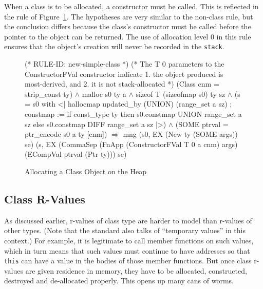 \documentclass[11pt]{article}
\begin{document}
When a class is to be allocated, a constructor must be called.  This
is reflected in the rule of Figure~\ref{fig:new-simple-class}.  The
hypotheses are very similar to the non-class rule, but the conclusion
differs because the class's constructor must be called before the
pointer to the object can be returned.  The use of allocation level 0
in this rule ensures that the object's creation will never be recorded
in the \texttt{stack}.
\begin{figure}[htbp]
\begin{stdrule}
(* RULE-ID: new-simple-class *)
(* The T 0 parameters to the ConstructorFVal constructor indicate
    1. the object produced is most-derived, and
    2. it is not stack-allocated
*)
     (Class cnm = strip_const ty) \(\land\)
     malloc s0 ty a \(\land\)
     sizeof T (sizeofmap s0) ty sz \(\land\)
     (s = s0 with <|
             hallocmap updated_by (UNION) (range_set a sz) ;
             constmap := if const_type ty then
                           s0.constmap UNION range_set a sz
                         else s0.constmap DIFF range_set a sz
          |>) \(\land\)
     (SOME ptrval = ptr_encode s0 a ty [cnm])
   \(\Rightarrow\)
     mng (s0, EX (New ty (SOME args)) se)
         (s, EX (CommaSep (FnApp (ConstructorFVal T 0 a cnm) args)
                          (ECompVal ptrval (Ptr ty)))
                se)
\end{stdrule}
\caption{Allocating a Class Object on the Heap}
\label{fig:new-simple-class}
\end{figure}

\subsection{Class R-Values}
\label{sec:class-rvalues}

As discussed earlier, r-values of class type are harder to model than
r-values of other types.  (Note that the standard also talks of
``temporary values'' in this context.) For example, it is legitimate
to call member functions on such values, which in turn means that such
values must continue to have addresses so that \texttt{this} can have
a value in the bodies of those member functions.  But once class
r-values are given residence in memory, they have to be allocated,
constructed, destroyed and de-allocated properly.  This opens up many
cans of worms.
\end{document}
